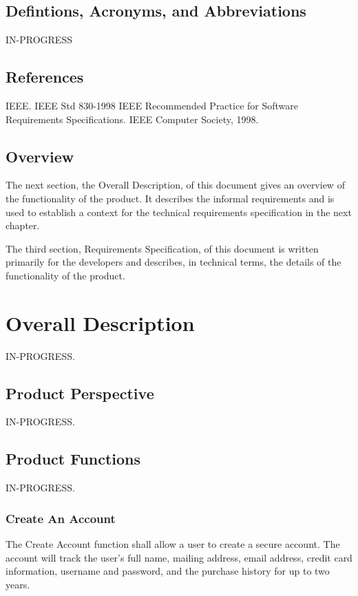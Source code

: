 \documentclass{scrreprt}
\begin{document}
\section{Defintions, Acronyms, and Abbreviations}

IN-PROGRESS

\section{References}

IEEE. IEEE Std 830-1998 IEEE Recommended Practice for Software Requirements
Specifications. IEEE Computer Society, 1998.

\section{Overview}

The next section, the Overall Description, of this document gives an overview
of the functionality of the product. It describes the informal requirements and
is used to establish a context for the technical requirements specification in
the next chapter. 

The third section, Requirements Specification, of this document is written
primarily for the developers and describes, in technical terms, the details of
the functionality of the product. 

\chapter{Overall Description}

IN-PROGRESS.

\section{Product Perspective}

IN-PROGRESS.

\section{Product Functions}

IN-PROGRESS.

\subsection{Create An Account}

The Create Account function shall allow a user to create a secure account. The
account will track the user’s full name, mailing address, email address, credit
card information, username and password, and the purchase history for up to two
years.
\end{document}
